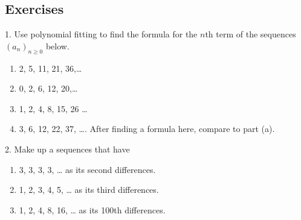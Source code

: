 \documentclass[10pt,]{book}
\theoremstyle{plain}
\theoremstyle{definition}
\numberwithin{equation}{chapter}
\begin{document}
\subsection[Exercises]{Exercises}\label{exercises_seq-polyfit}
\begin{exerciselist}
\item[1.]\hypertarget{exercise-162}{}
          Use polynomial fitting to find the formula for the \(n\)th term of the sequences \((a_n)_{n \ge 0}\) below.
          \leavevmode%
\begin{enumerate}[label=(\alph*)]
\item\hypertarget{li-560}{}
                2, 5, 11, 21, 36,\dots{}
\item\hypertarget{li-561}{}
                0, 2, 6, 12, 20,\dots{}
\item\hypertarget{li-562}{}
                1, 2, 4, 8, 15, 26 \dots{}
\item\hypertarget{li-563}{}
                3, 6, 12, 22, 37, \dots{}.  After finding a formula here, compare to part (a).
\end{enumerate}

\par\smallskip
\item[2.]\hypertarget{exercise-163}{}
        Make up a sequences that have
        \leavevmode%
\begin{enumerate}[label=(\alph*)]
\item\hypertarget{li-566}{}3, 3, 3, 3, \dots{} as its second differences.%
\item\hypertarget{li-567}{}1, 2, 3, 4, 5, \dots{} as its third differences.%
\item\hypertarget{li-568}{}1, 2, 4, 8, 16, \dots{} as its 100th differences.%
\end{enumerate}


\end{exerciselist}
\end{document}
